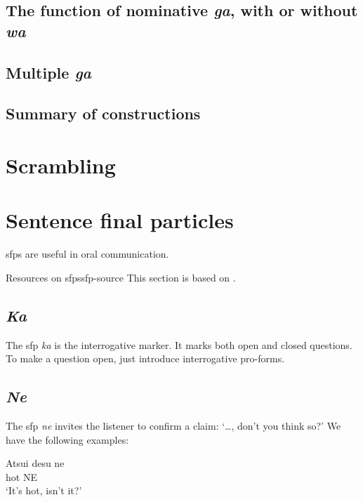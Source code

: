 \documentclass[UTF8, a4paper, oneside, scheme=plain]{ctexrep}
\newcommand*{\citesec}[1]{\S~{#1}}
\newcommand{\corpus}[1]{\emph{#1}}
\newcommand{\translate}[1]{`#1'}
\begin{document}
\subsection{The function of nominative \corpus{ga}, with or without \corpus{wa}} 

\subsection{Multiple \corpus{ga}}\label{sec:multiple-ga}

\subsection{Summary of constructions}\label{sec:wa-ga-template}

\section{Scrambling}\label{sec:scrambling}

\section{Sentence final particles}\label{sec:sfp}

\ac{sfp}s are useful in oral communication.

\begin{infobox}{Resources on \ac{sfp}s}{sfp-source}
    This section is based on \citet[\citesec{6.4}]{akiyama2012japanese}.
\end{infobox}

\subsection{\corpus{Ka}}

The \ac{sfp} \corpus{ka} is the interrogative marker.
It marks both open and closed questions.
To make a question open,
just introduce interrogative pro-forms.

\subsection{\corpus{Ne}}

The \ac{sfp} \corpus{ne} invites the listener to confirm a claim:
\translate{\dots, don't you think so?}
We have the following examples:
\begin{exe}
    \ex \gll Atsui desu ne  \\
    hot {} NE  \\
    \glt \translate{It's hot, isn't it?}
\end{exe}
\end{document}
